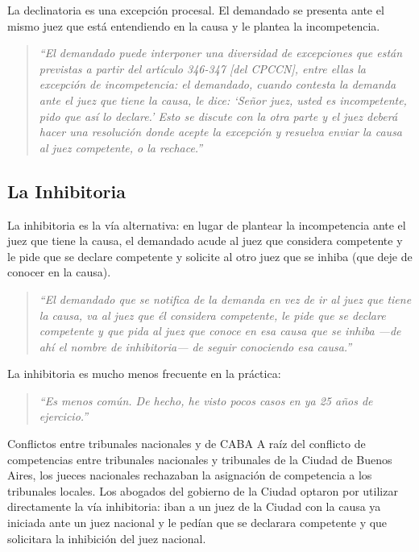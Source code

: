 \documentclass[12pt,oneside]{book}
\begin{document}
La declinatoria es una excepción procesal. El demandado se presenta ante el mismo juez que está entendiendo en la causa y le plantea la incompetencia.

\begin{quote}
\itshape
``El demandado puede interponer una diversidad de excepciones que están previstas a partir del artículo 346-347 [del CPCCN], entre ellas la excepción de incompetencia: el demandado, cuando contesta la demanda ante el juez que tiene la causa, le dice: `Señor juez, usted es incompetente, pido que así lo declare.' Esto se discute con la otra parte y el juez deberá hacer una resolución donde acepte la excepción y resuelva enviar la causa al juez competente, o la rechace.''
\end{quote}

\subsection{La Inhibitoria}

La inhibitoria es la vía alternativa: en lugar de plantear la incompetencia ante el juez que tiene la causa, el demandado acude al juez que considera competente y le pide que se declare competente y solicite al otro juez que se inhiba (que deje de conocer en la causa).

\begin{quote}
\itshape
``El demandado que se notifica de la demanda en vez de ir al juez que tiene la causa, va al juez que él considera competente, le pide que se declare competente y que pida al juez que conoce en esa causa que se inhiba —de ahí el nombre de inhibitoria— de seguir conociendo esa causa.''
\end{quote}

La inhibitoria es mucho menos frecuente en la práctica:

\begin{quote}
\itshape
``Es menos común. De hecho, he visto pocos casos en ya 25 años de ejercicio.''
\end{quote}

\begin{example}{Conflictos entre tribunales nacionales y de CABA}
A raíz del conflicto de competencias entre tribunales nacionales y tribunales de la Ciudad de Buenos Aires, los jueces nacionales rechazaban la asignación de competencia a los tribunales locales. Los abogados del gobierno de la Ciudad optaron por utilizar directamente la vía inhibitoria: iban a un juez de la Ciudad con la causa ya iniciada ante un juez nacional y le pedían que se declarara competente y que solicitara la inhibición del juez nacional.
\end{example}
\end{document}
